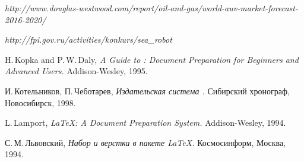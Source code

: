 \begin{thebibliography}{9}

  \textit{http://www.douglas-westwood.com/report/oil-and-gas/world-auv-market-forecast-2016-2020/}

	\textit{http://fpi.gov.ru/activities/konkurs/sea\_robot}

  H.\,Kopka and P.\,W.\,Daly,
  \textit{A Guide to \LaTeXe: Document Preparation for Beginners
  and Advanced Users.} Addison-Wesley, 1995.

  И.\,Котельников, П.\,Чеботарев,
  \textit{Издательская система \LaTeXe.}
  Сибирский хронограф, Новосибирск, 1998.

  L.\,Lamport,
  \textit{\LaTeX: A Document Preparation System.}
  Addison-Wesley, 1994.

  С.\,М.\,Львовский,
  \textit{Набор и верстка в пакете \LaTeX.}
  Космосинформ, Москва, 1994.

\end{thebibliography}



